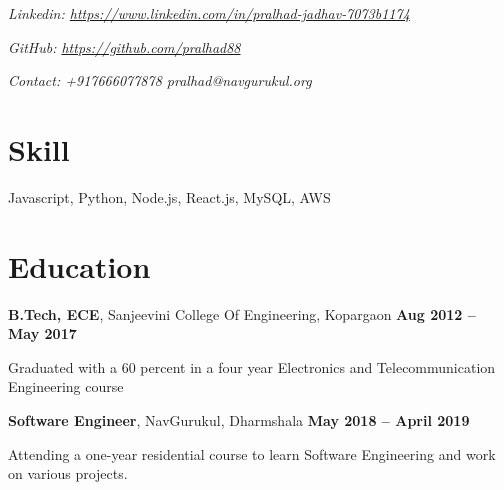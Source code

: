 \documentclass[margin,line]{resume}
\begin{document}
\begin{resume}
    \hfill \textsl{Linkedin: \url{https://www.linkedin.com/in/pralhad-jadhav-7073b1174}} 

    \hfill \textsl{GitHub: \url{https://github.com/pralhad88}} 

     \hfill \textsl{Contact: +917666077878 pralhad@navgurukul.org} 
    \section{\mysidestyle Skill}
    Javascript, Python, Node.js, React.js, MySQL, AWS \vspace{-1.5mm} \
    
    \section {\mysidestyle Education}

    \textbf{B.Tech, ECE}, Sanjeevini College Of Engineering, Kopargaon \hfill \textbf{Aug 2012 -- May 2017}
    \begin{list2}
        \item Graduated with a 60 percent in a four year Electronics and Telecommunication Engineering course
    \end{list2}\vspace{-1.5mm}

    \textbf{Software Engineer}, NavGurukul, Dharmshala \hfill \textbf{May 2018 -- April 2019}
    \begin{list2}
        \item Attending a one-year residential course to learn Software Engineering and work on various projects​.
    \end{list2}\vspace{-1.5mm}


\end{resume}
\end{document}

